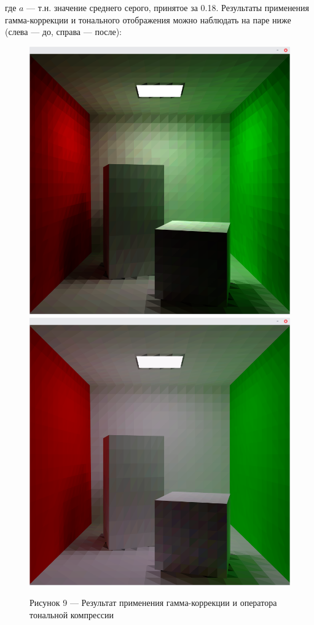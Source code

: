 \documentclass[12pt]{article}
\begin{document}
где $a$ --- т.н. значение среднего серого, принятое за 0.18. Результаты применения гамма-коррекции и тонального отображения можно наблюдать на паре ниже (слева --- до, справа --- после):
\begin{figure}[h]
\centering
\includegraphics[scale=0.3]{bad_colors.png}
\includegraphics[scale=0.3]{good_colors.png}
\caption*{Рисунок 9 --- Результат применения гамма-коррекции и оператора тональной компрессии}
\end{figure}
\end{document}
